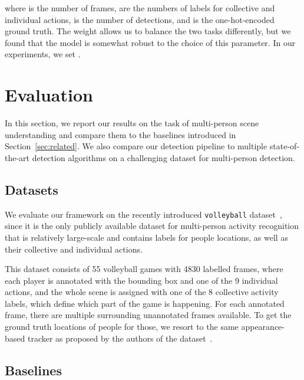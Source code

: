 \documentclass[10pt,twocolumn,letterpaper]{article}
\begin{document}
where  is the number of frames,  are the numbers of labels for
collective and individual actions,  is the number of detections, and 
 is the one-hot-encoded ground truth. The weight
 allows us to balance the two tasks differently, but we found that the model
is somewhat robust to the choice of this parameter. In our experiments, we set 
.
 \vspace{-0.1cm}
\section{Evaluation}
\vspace{-0.15cm}
\label{sec:evaluation}

In this section, we report our results on the task of multi-person scene 
understanding and compare them to the baselines introduced in 
Section~\ref{sec:related}. We also compare our detection pipeline to 
multiple state-of-the-art detection algorithms on a challenging dataset
for multi-person detection.

\subsection{Datasets}

We evaluate our framework on the recently introduced \texttt{volleyball} 
dataset~\cite{Ibrahim2016}, since it is the only
publicly available dataset for multi-person activity recognition that is 
relatively large-scale and contains labels for people locations, as well 
as their collective and individual actions.

This dataset consists of 55 volleyball games with 4830 labelled frames, where
each player is annotated with the bounding box and one of the 9 individual actions,
and the whole scene is assigned with one of the 8 collective activity labels, which
define which part of the game is happening. For each
annotated frame, there are multiple surrounding unannotated frames available. To
get the ground truth locations of people for those, we resort to the same
appearance-based tracker as proposed by the authors of the dataset~\cite{Ibrahim2016}.







\subsection{Baselines}
\end{document}
